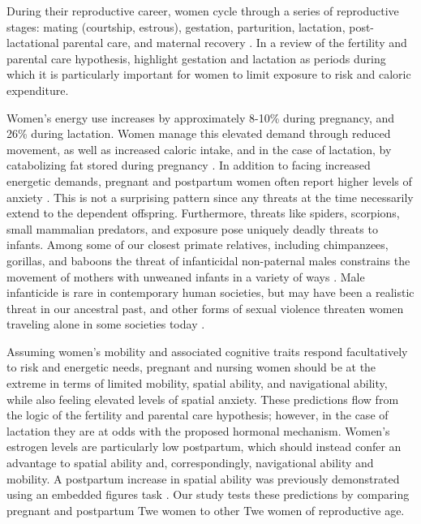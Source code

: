 During their reproductive career, women cycle through a series of reproductive stages: mating (courtship, estrous), gestation, parturition, lactation, post-lactational parental care, and maternal recovery \citep{gittleman1988energy}.  In a review of the fertility and parental care hypothesis, \citet{jones2003evolution} highlight gestation and lactation as periods during which it is particularly important for women to limit exposure to risk and caloric expenditure.  

Women's energy use increases by approximately 8-10\% during pregnancy, and 26\% during lactation.  Women manage this elevated demand through reduced movement, as well as increased caloric intake, and in the case of lactation, by catabolizing fat stored during pregnancy \citep{dufour2002comparative}.  In addition to facing increased energetic demands, pregnant and postpartum women often report higher levels of anxiety \citep{heron2004course, wenzel2003prevalence}.  This is not a surprising pattern since any threats at the time necessarily extend to the dependent offspring.  Furthermore, threats like spiders, scorpions, small mammalian predators, and exposure pose uniquely deadly threats to infants.  Among some of our closest primate relatives, including chimpanzees, gorillas, and baboons the threat of infanticidal non-paternal males constrains the movement of mothers with unweaned infants in a variety of ways \citep{collins1984infanticide, watts1989infanticide, smuts1992male, stokes2003female, watts2000infanticide}.  Male infanticide is rare in contemporary human societies, but may have been a realistic threat in our ancestral past, and other forms of sexual violence threaten women traveling alone in some societies today \citep{gregor1987anxious}.

\label{lact_disc}
Assuming women's mobility and associated cognitive traits respond facultatively to risk and energetic needs, pregnant and nursing women should be at the extreme in terms of limited mobility, spatial ability, and navigational ability, while also feeling elevated levels of spatial anxiety.  These predictions flow from the logic of the fertility and parental care hypothesis; however, in the case of lactation they are at odds with the proposed hormonal mechanism.  Women's estrogen levels are particularly low postpartum, which should instead confer an advantage to spatial ability and, correspondingly, navigational ability and mobility.  A postpartum increase in spatial ability was previously demonstrated using an embedded figures task \citep{woodfield1984embedded}.  Our study tests these predictions by comparing pregnant and postpartum Twe women to other Twe women of reproductive age.

